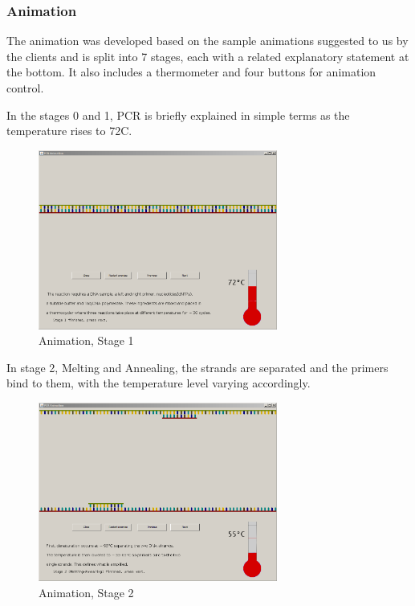 

\begin{frame}
\frametitle{Animation}
The animation was developed based on the sample animations suggested to us by the clients and is split into 7 stages, each with a related explanatory statement at the bottom. It also includes a thermometer and four buttons for animation control.
\end{frame}

\begin{frame}
In the stages 0 and 1, PCR is briefly explained in simple terms as the temperature rises to 72\degree C.
\begin{figure}[h]
  \begin{center}
	\includegraphics[width=0.7\textwidth]{./img/AnimImpl/Stage1.png}
    \caption{
      \label{fig:AnimImpl:stage1}
      Animation, Stage 1
    }
  \end{center}
\end{figure}
\end{frame}


\begin{frame}
In stage 2, Melting and Annealing, the strands are separated and the primers bind to them, with the temperature level varying accordingly.

\begin{figure}[!t]
  \begin{center}
	\includegraphics[width=0.7\textwidth]{./img/AnimImpl/Stage2.png}
    \caption{
      \label{fig:AnimImpl:stage2}
      Animation, Stage 2
    }
  \end{center}
\end{figure}
\end{frame}

